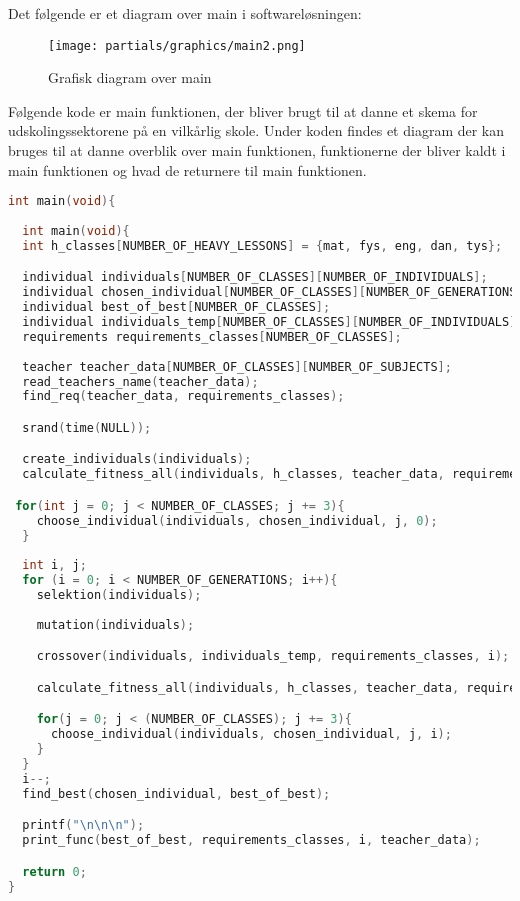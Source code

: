 Det følgende er et diagram over main i softwareløsningen:
\begin{figure}[!h]
\texttt{[image: partials/graphics/main2.png]}
\caption{Grafisk diagram over main}
\label{fig:diagrammain}
\end{figure}

Følgende kode er main funktionen, der bliver brugt til at danne et skema for udskolingssektorene på en vilkårlig skole. Under koden findes et diagram der kan bruges til at danne overblik over main funktionen, funktionerne der bliver kaldt i main funktionen og hvad de returnere til main funktionen. 
\begin{lstlisting}[showstringspaces=false,language = c]
int main(void){
  
  int main(void){
  int h_classes[NUMBER_OF_HEAVY_LESSONS] = {mat, fys, eng, dan, tys};

  individual individuals[NUMBER_OF_CLASSES][NUMBER_OF_INDIVIDUALS];
  individual chosen_individual[NUMBER_OF_CLASSES][NUMBER_OF_GENERATIONS];
  individual best_of_best[NUMBER_OF_CLASSES];
  individual individuals_temp[NUMBER_OF_CLASSES][NUMBER_OF_INDIVIDUALS];
  requirements requirements_classes[NUMBER_OF_CLASSES];
  
  teacher teacher_data[NUMBER_OF_CLASSES][NUMBER_OF_SUBJECTS];
  read_teachers_name(teacher_data);
  find_req(teacher_data, requirements_classes);

  srand(time(NULL));

  create_individuals(individuals);
  calculate_fitness_all(individuals, h_classes, teacher_data, requirements_classes);

 for(int j = 0; j < NUMBER_OF_CLASSES; j += 3){
    choose_individual(individuals, chosen_individual, j, 0);
  }
 
  int i, j;
  for (i = 0; i < NUMBER_OF_GENERATIONS; i++){
    selektion(individuals);
    
    mutation(individuals);

    crossover(individuals, individuals_temp, requirements_classes, i);

    calculate_fitness_all(individuals, h_classes, teacher_data, requirements_classes);

    for(j = 0; j < (NUMBER_OF_CLASSES); j += 3){
      choose_individual(individuals, chosen_individual, j, i);  
    }
  }
  i--;
  find_best(chosen_individual, best_of_best);

  printf("\n\n\n");
  print_func(best_of_best, requirements_classes, i, teacher_data);

  return 0;
}
\end{lstlisting}

